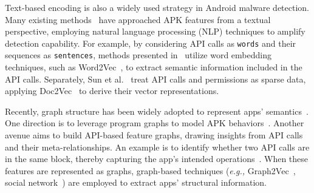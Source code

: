 Text-based encoding is also a widely used strategy in Android malware detection.
Many existing methods~\cite{xu2018deeprefiner,xu2020sdac,karbab2021petadroid,karbab2018maldozer,sun2019scalable} have approached APK features from a textual perspective, employing natural language processing (NLP) techniques to amplify detection capability.
For example, by considering API calls as \texttt{words} and their sequences as \texttt{sentences}, methods presented in~\cite{xu2020sdac,karbab2021petadroid,karbab2018maldozer} utilize word embedding techniques, such as Word2Vec~\cite{mikolov2013distributed}, to extract semantic information included in the API calls.
Separately, Sun et al.~\cite{sun2019scalable} treat API calls and permissions as sparse data, applying Doc2Vec~\cite{le2014distributed} to derive their vector representations.

Recently, graph structure has been widely adopted to represent apps' semantics~\cite{he2022msdroid,li2023black}.
One direction is to leverage program graphs to model APK behaviors~\cite{wu2019malscan,wu2021homdroid,he2022msdroid,pektacs2020deep,pektacs2020learning}.
Another avenue aims to build API-based feature graphs, drawing insights from API calls and their meta-relationships. 
An example is to identify whether two API calls are in the same block, thereby capturing the app's intended operations~\cite{hou2017hindroid,huang2019deep}.
When these features are represented as graphs, graph-based techniques (\textit{e.g.,} Graph2Vec~\cite{narayanan2017graph2vec}, social network~\cite{wu2019malscan}) are employed to extract apps' structural information.



